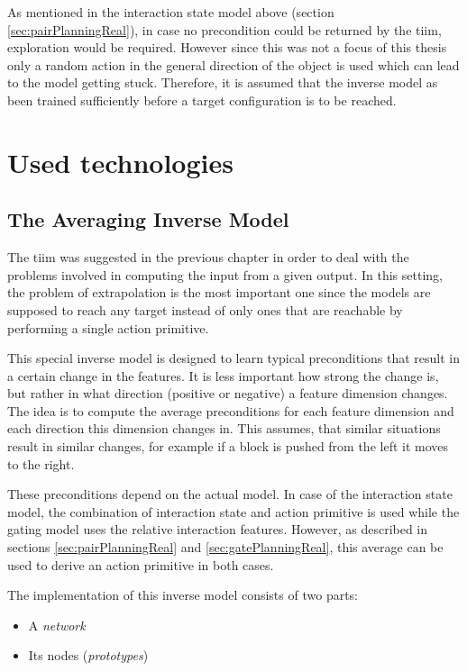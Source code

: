 As mentioned in the interaction state model above (section \ref{sec:pairPlanningReal}), in case no precondition could be returned by the \gls{tiim}, exploration would be required. However since this was not a focus of this thesis only a random action in the general direction of the object is used which
can lead to the model getting stuck. Therefore, it is assumed that the inverse model as been trained sufficiently before a target configuration is to be reached.

\section{Used technologies \label{sec:technologies}}

\subsection{The Averaging Inverse Model \label{sec:invModelRealization}} 

The \acrfull{tiim} was suggested in the previous chapter in order to deal with the problems involved in computing the input from a given output. In this setting, the problem of extrapolation is the most important one since the models are supposed to reach any target instead of only ones that are reachable by performing a single action primitive.

This special inverse model is designed to learn typical preconditions that result in a certain change in the features. It is less important how strong the change is, but rather in what direction (positive or negative) a feature dimension changes. The idea is to compute the average preconditions for each feature dimension and each direction this dimension changes in. This assumes, that similar situations result in similar changes, for example if a block is pushed from the left it moves to the right.
 
These preconditions depend on the actual model. In case of the interaction state model, the combination of interaction state and action primitive is used while the gating model uses the relative interaction features. However, as described in sections \ref{sec:pairPlanningReal} and \ref{sec:gatePlanningReal}, this average can be used to derive an action primitive in both cases.

The implementation of this inverse model consists of two parts: 
\begin{itemize}
\item A \textit{network}
\item Its nodes (\textit{prototypes})
\end{itemize}

